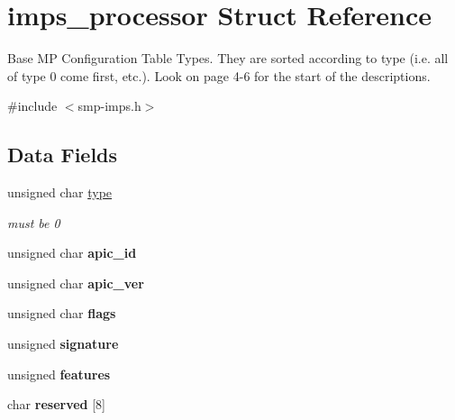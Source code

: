 \hypertarget{structimps__processor}{}\section{imps\+\_\+processor Struct Reference}
\label{structimps__processor}


Base MP Configuration Table Types. They are sorted according to type (i.\+e. all of type 0 come first, etc.). Look on page 4-\/6 for the start of the descriptions.  




{\ttfamily \#include $<$smp-\/imps.\+h$>$}

\subsection*{Data Fields}
\begin{DoxyCompactItemize}
\item 
\mbox{\label{structimps__processor_af0cd69157b35990203d21e397037c234}} 
unsigned char \mbox{\hyperlink{structimps__processor_af0cd69157b35990203d21e397037c234}{type}}
\begin{DoxyCompactList}\small\item\em must be 0 \end{DoxyCompactList}\item 
\mbox{\label{structimps__processor_af9525ee5d6712879b4172aeab31d8152}} 
unsigned char {\bfseries apic\+\_\+id}
\item 
\mbox{\label{structimps__processor_adf9cdbab1ec82a6926a674ce721db6d3}} 
unsigned char {\bfseries apic\+\_\+ver}
\item 
\mbox{\label{structimps__processor_ada5a02d2ea6b173bca0df3df6d600afd}} 
unsigned char {\bfseries flags}
\item 
\mbox{\label{structimps__processor_a221421670c521ebe5268223a36de46e6}} 
unsigned {\bfseries signature}
\item 
\mbox{\label{structimps__processor_a64bcd3044cb92b4e284557f4cba924b4}} 
unsigned {\bfseries features}
\item 
\mbox{\label{structimps__processor_a46e8bfdecae94009fc03d061a99d9bff}} 
char {\bfseries reserved} \mbox{[}8\mbox{]}
\end{DoxyCompactItemize}


